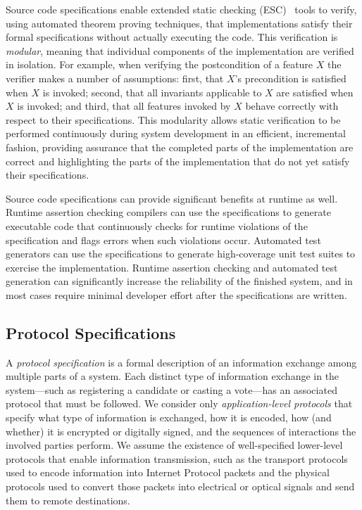 Source code specifications enable extended static checking
(ESC)~\cite{ESC98} tools to verify, using automated theorem proving
techniques, that implementations satisfy their formal specifications
without actually executing the code. This verification is
\emph{modular}, meaning that individual components of the
implementation are verified in isolation. For example, when verifying
the postcondition of a feature $X$ the verifier makes a number of
assumptions: first, that $X$'s precondition is satisfied when $X$ is
invoked; second, that all invariants applicable to $X$ are satisfied
when $X$ is invoked; and third, that all features invoked by $X$
behave correctly with respect to their specifications. This modularity
allows static verification to be performed continuously during system
development in an efficient, incremental fashion, providing assurance
that the completed parts of the implementation are correct and
highlighting the parts of the implementation that do not yet satisfy
their specifications.

Source code specifications can provide significant benefits at runtime
as well. Runtime assertion checking compilers can use the
specifications to generate executable code that continuously checks
for runtime violations of the specification and flags errors when such
violations occur. Automated test generators can use the specifications
to generate high-coverage unit test suites to exercise the
implementation. Runtime assertion checking and automated test
generation can significantly increase the reliability of the finished
system, and in most cases require minimal developer effort after the
specifications are written.

\subsection{Protocol Specifications}

A \emph{protocol specification} is a formal description of an
information exchange among multiple parts of a system. Each distinct
type of information exchange in the system---such as registering a
candidate or casting a vote---has an associated protocol that must be
followed. We consider only \emph{application-level protocols} that
specify what type of information is exchanged, how it is encoded, how
(and whether) it is encrypted or digitally signed, and the sequences
of interactions the involved parties perform. We assume the existence
of well-specified lower-level protocols that enable information
transmission, such as the transport protocols used to encode
information into Internet Protocol packets and the physical protocols
used to convert those packets into electrical or optical signals and
send them to remote destinations.

